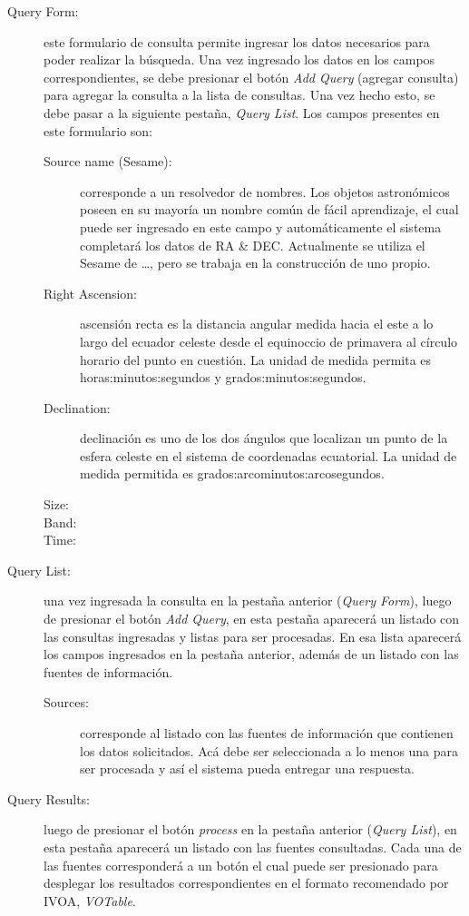 \begin{description}
  \item [Query Form:] este formulario de consulta permite ingresar los
    datos necesarios para poder realizar la búsqueda. Una vez
    ingresado los datos en los campos correspondientes, se debe
    presionar el botón \emph{Add Query} (agregar consulta) para
    agregar la consulta a la lista de consultas. Una vez hecho esto,
    se debe pasar a la siguiente pestaña, \emph{Query List}. Los
    campos presentes en este formulario son:
    \begin{description}
      \item [Source name (Sesame):] corresponde a un resolvedor de
	nombres. Los objetos astronómicos poseen en su mayoría un
	nombre común de fácil aprendizaje, el cual puede ser ingresado
	en este campo y automáticamente el sistema completará los
	datos de RA \& DEC. Actualmente se utiliza el Sesame de
	{\ldots}, pero se trabaja en la construcción de uno propio.
      \item [Right Ascension:] ascensión recta es la distancia angular
	medida hacia el este a lo largo del ecuador celeste desde el
	equinoccio de primavera al círculo horario del punto en
	cuestión. La unidad de medida permita es
	horas:minutos:segundos y grados:minutos:segundos.
      \item [Declination:] declinación es uno de los dos ángulos que
	localizan un punto de la esfera celeste en el sistema de
	coordenadas ecuatorial. La unidad de medida permitida es
	grados:arcominutos:arcosegundos.
      \item [Size:] 
      \item [Band:]
      \item [Time:]
    \end{description}  
  \item [Query List:] una vez ingresada la consulta en la pestaña
    anterior (\emph{Query Form}), luego de presionar el botón
    \emph{Add Query}, en esta pestaña aparecerá un listado con las
    consultas ingresadas y listas para ser procesadas. En esa lista
    aparecerá los campos ingresados en la pestaña anterior, además de
    un listado con las fuentes de información.
    \begin{description}
      \item [Sources:] corresponde al listado con las fuentes de
	información que contienen los datos solicitados. Acá debe ser
	seleccionada a lo menos una para ser procesada y así el
	sistema pueda entregar una respuesta.
    \end{description}  
  \item [Query Results:] luego de presionar el botón \emph{process} en
    la pestaña anterior (\emph{Query List}), en esta pestaña
    aparecerá un listado con las fuentes consultadas. Cada una de las
    fuentes corresponderá a un botón el cual puede ser presionado para
    desplegar los resultados correspondientes en el formato
    recomendado por IVOA, \emph{VOTable}.
\end{description}


